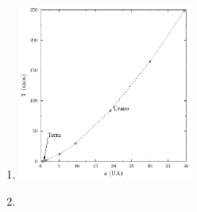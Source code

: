 \documentclass[a4paper]{article}
\begin{document}
\begin{respostas}
\begin{exercicio}
  
  \begin{enumerate}
  \item {}\hfill
    \begin{center}
    \includegraphics[width=0.45\textwidth]{Txa_planetas_Sistema_Solar}
    \end{center}
    
  \item {}\hfill
  

\end{enumerate}
\end{exercicio}
\end{respostas}
\end{document}
